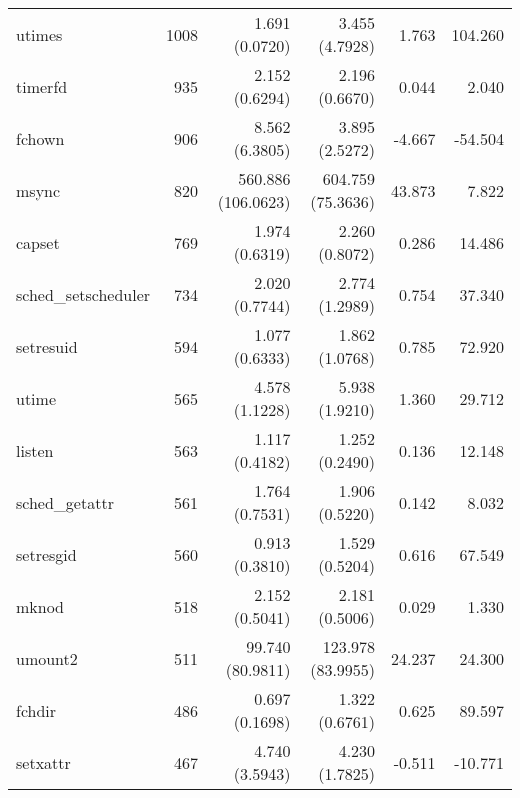 \begin{longtable}{>{\ttfamily}lrrrrr}
                         utimes &        1008 &           1.691 (0.0720) &           3.455 (4.7928) &           1.763 &      104.260 \\
                        timerfd &         935 &           2.152 (0.6294) &           2.196 (0.6670) &           0.044 &        2.040 \\
                         fchown &         906 &           8.562 (6.3805) &           3.895 (2.5272) &          -4.667 &      -54.504 \\
                          msync &         820 &       560.886 (106.0623) &        604.759 (75.3636) &          43.873 &        7.822 \\
                         capset &         769 &           1.974 (0.6319) &           2.260 (0.8072) &           0.286 &       14.486 \\
            sched\_setscheduler &         734 &           2.020 (0.7744) &           2.774 (1.2989) &           0.754 &       37.340 \\
                      setresuid &         594 &           1.077 (0.6333) &           1.862 (1.0768) &           0.785 &       72.920 \\
                          utime &         565 &           4.578 (1.1228) &           5.938 (1.9210) &           1.360 &       29.712 \\
                         listen &         563 &           1.117 (0.4182) &           1.252 (0.2490) &           0.136 &       12.148 \\
                 sched\_getattr &         561 &           1.764 (0.7531) &           1.906 (0.5220) &           0.142 &        8.032 \\
                      setresgid &         560 &           0.913 (0.3810) &           1.529 (0.5204) &           0.616 &       67.549 \\
                          mknod &         518 &           2.152 (0.5041) &           2.181 (0.5006) &           0.029 &        1.330 \\
                        umount2 &         511 &         99.740 (80.9811) &        123.978 (83.9955) &          24.237 &       24.300 \\
                         fchdir &         486 &           0.697 (0.1698) &           1.322 (0.6761) &           0.625 &       89.597 \\
                       setxattr &         467 &           4.740 (3.5943) &           4.230 (1.7825) &          -0.511 &      -10.771 \\

\end{longtable}
